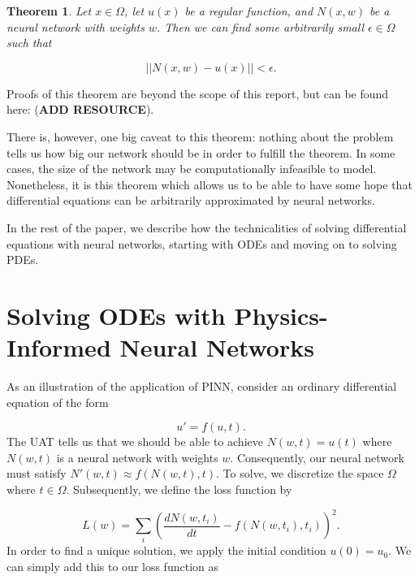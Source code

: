 \documentclass{CUP-JNL-DTM}%
\newtheorem{theorem}{Theorem}[section]
\theoremstyle{definition}
\numberwithin{equation}{section}
\begin{document}
\begin{theorem}

Let $x \in \Omega$, let $u(x)$ be a regular function, and $N(x,w)$ be a neural network with weights $w$. Then we can find some arbitrarily small $\epsilon \in \Omega$ such that 

\begin{equation}
	||N(x,w) - u(x)|| < \epsilon. 
\end{equation}

\end{theorem}

\noindent Proofs of this theorem are beyond the scope of this report, but can be found here: (\textbf{ADD RESOURCE}). 

There is, however, one big caveat to this theorem: nothing about the problem tells us how big our network should be in order to fulfill the theorem. In some cases, the size of the network may be computationally infeasible to model. Nonetheless, it is this theorem which allows us to be able to have some hope that differential equations can be arbitrarily approximated by neural networks. 

In the rest of the paper, we describe how the technicalities of solving differential equations with neural networks, starting with ODEs and moving on to solving PDEs. 


\section{Solving ODEs with Physics-Informed Neural Networks}

As an illustration of the application of PINN, consider an ordinary differential equation of the form 

\begin{equation}
	u' = f(u,t). 
\end{equation}
The UAT tells us that we should be able to achieve $N(w,t) = u(t)$ where $N(w,t)$ is a neural network with weights $w$. Consequently, our neural network must satisfy $N'(w,t) \approx f(N(w,t), t)$. To solve, we discretize the space $\Omega$ where $t \in \Omega$. Subsequently, we define the loss function by 

\begin{equation}
	L(w) = \sum_i \left( \frac{dN(w, t_i)}{dt} - f(N(w,t_i), t_i)\right)^2. 
\end{equation}
In order to find a unique solution, we apply the initial condition $u(0) = u_0$. We can simply add this to our loss function as 
\end{document}

